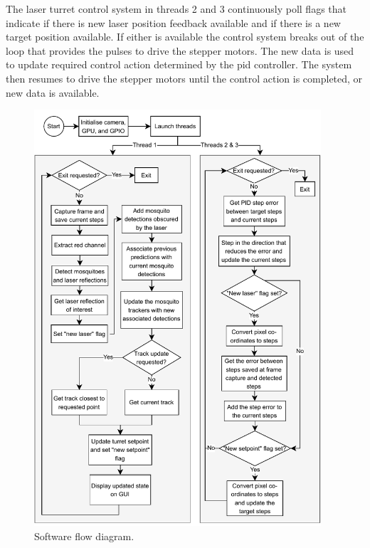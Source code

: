 The laser turret control system in threads 2 and 3 continuously poll flags that indicate if there is new laser position feedback available and if there is a new target position available. If either is available the control system breaks out of the loop that provides the pulses to drive the stepper motors. The new data is used to update required control action determined by the \gls{pid} controller. The system then resumes to drive the stepper motors until the control action is completed, or new data is available.
\begin{figure}[h]
  \centering
  \includegraphics[width=0.95\textwidth]{figures/software_flow_diagram.pdf}
  \caption{Software flow diagram.}
  \label{fig:software_flow_diagram}
\end{figure}

\newpage


